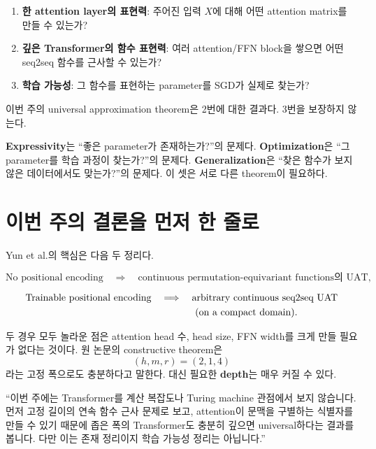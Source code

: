 \documentclass[11pt,a4paper,oneside,openany]{memoir}
\theoremstyle{definition}
\begin{document}
\begin{enumerate}
  \item \textbf{한 attention layer의 표현력}: 주어진 입력 $X$에 대해 어떤 attention matrix를 만들 수 있는가?
  \item \textbf{깊은 Transformer의 함수 표현력}: 여러 attention/FFN block을 쌓으면 어떤 seq2seq 함수를 근사할 수 있는가?
  \item \textbf{학습 가능성}: 그 함수를 표현하는 parameter를 SGD가 실제로 찾는가?
\end{enumerate}

이번 주의 universal approximation theorem은 2번에 대한 결과다. 3번을 보장하지 않는다.

\begin{keybox}
\textbf{Expressivity}는 ``좋은 parameter가 존재하는가?''의 문제다.
\textbf{Optimization}은 ``그 parameter를 학습 과정이 찾는가?''의 문제다.
\textbf{Generalization}은 ``찾은 함수가 보지 않은 데이터에서도 맞는가?''의 문제다.
이 셋은 서로 다른 theorem이 필요하다.
\end{keybox}

\section{이번 주의 결론을 먼저 한 줄로}

Yun et al.의 핵심은 다음 두 정리다.

\[
\text{No positional encoding}
\quad\Longrightarrow\quad
\text{continuous permutation-equivariant functions의 UAT},
\]

\[
\begin{aligned}
\text{Trainable positional encoding}
&\quad\Longrightarrow\quad\text{arbitrary continuous seq2seq UAT}\\
&\hspace{4.5em}\text{(on a compact domain).}
\end{aligned}
\]

두 경우 모두 놀라운 점은 attention head 수, head size, FFN width를 크게 만들 필요가 없다는 것이다.
원 논문의 constructive theorem은
\[
(h,m,r)=(2,1,4)
\]
라는 고정 폭으로도 충분하다고 말한다. 대신 필요한 \textbf{depth}는 매우 커질 수 있다.

\begin{presentbox}
``이번 주에는 Transformer를 계산 복잡도나 Turing machine 관점에서 보지 않습니다. 먼저 고정 길이의 연속 함수 근사 문제로 보고,
attention이 문맥을 구별하는 식별자를 만들 수 있기 때문에 좁은 폭의 Transformer도 충분히 깊으면 universal하다는 결과를 봅니다.
다만 이는 존재 정리이지 학습 가능성 정리는 아닙니다.''
\end{presentbox}
\end{document}
